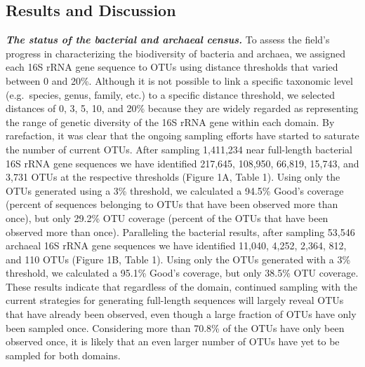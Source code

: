 \documentclass[11pt,]{article}
\begin{document}
\subsection{Results and Discussion}\label{results-and-discussion}

\textbf{\emph{The status of the bacterial and archaeal census.}} To
assess the field's progress in characterizing the biodiversity of
bacteria and archaea, we assigned each 16S rRNA gene sequence to OTUs
using distance thresholds that varied between 0 and 20\%. Although it is
not possible to link a specific taxonomic level (e.g.~species, genus,
family, etc.) to a specific distance threshold, we selected distances of
0, 3, 5, 10, and 20\% because they are widely regarded as representing
the range of genetic diversity of the 16S rRNA gene within each domain.
By rarefaction, it was clear that the ongoing sampling efforts have
started to saturate the number of current OTUs. After sampling 1,411,234
near full-length bacterial 16S rRNA gene sequences we have identified
217,645, 108,950, 66,819, 15,743, and 3,731 OTUs at the respective
thresholds (Figure 1A, Table 1). Using only the OTUs generated using a
3\% threshold, we calculated a 94.5\% Good's coverage (percent of
sequences belonging to OTUs that have been observed more than once), but
only 29.2\% OTU coverage (percent of the OTUs that have been observed
more than once). Paralleling the bacterial results, after sampling
53,546 archaeal 16S rRNA gene sequences we have identified 11,040,
4,252, 2,364, 812, and 110 OTUs (Figure 1B, Table 1). Using only the
OTUs generated with a 3\% threshold, we calculated a 95.1\% Good's
coverage, but only 38.5\% OTU coverage. These results indicate that
regardless of the domain, continued sampling with the current strategies
for generating full-length sequences will largely reveal OTUs that have
already been observed, even though a large fraction of OTUs have only
been sampled once. Considering more than 70.8\% of the OTUs have only
been observed once, it is likely that an even larger number of OTUs have
yet to be sampled for both domains.
\end{document}
